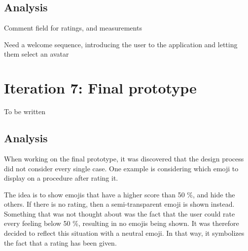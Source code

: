 \subsection{Analysis}

Comment field for ratings, and measurements

Need a welcome sequence, introducing the user to the application and letting them select an avatar

\section{Iteration 7: Final prototype}
\label{sec:iteration7}

To be written

\subsection{Analysis}
When working on the final prototype, it was discovered that the design process did not consider every single case. One example is considering which emoji to display on a procedure after rating it.

The idea is to show emojis that have a higher score than 50 \%, and hide the others. If there is no rating, then a semi-transparent emoji is shown instead. Something that was not thought about was the fact that the user could rate every feeling below 50 \%, resulting in no emojis being shown. It was therefore decided to reflect this situation with a neutral emoji. In that way, it symbolizes the fact that a rating has been given.
